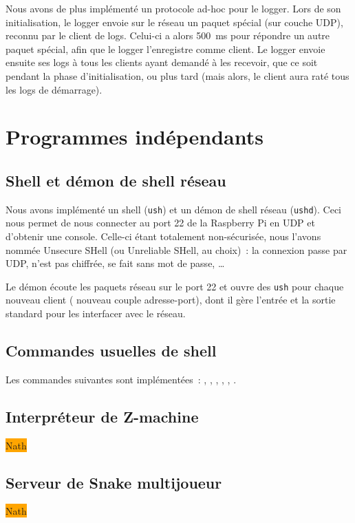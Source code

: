 \documentclass[11pt,a4paper]{article}
\newcommand{\fname}[1]{\texttt{#1}} %
\newcommand{\todo}[1]{\colorbox{orange}{\color{blue}{\Large TODO:} #1}}
\begin{document}
Nous avons de plus implémenté un protocole ad-hoc pour le logger.
Lors de son initialisation, le logger envoie sur le réseau un paquet spécial
(sur couche UDP), reconnu par le client de logs. Celui-ci a alors 500\ ms pour
répondre un autre paquet spécial, afin que le logger l'enregistre comme
client. Le logger envoie ensuite ses logs à tous les clients ayant demandé à
les recevoir, que ce soit pendant la phase d'initialisation, ou plus tard
(mais alors, le client aura raté tous les logs de démarrage).

\section{Programmes indépendants}

\subsection{Shell et démon de shell réseau}
Nous avons implémenté un shell (\fname{ush}) et un démon de shell réseau
(\fname{ushd}). Ceci nous permet de nous connecter au port 22 de la
Raspberry Pi en UDP et d'obtenir une console. Celle-ci étant totalement
non-sécurisée, nous l'avons nommée Unsecure SHell (ou Unreliable SHell,
au choix)~: la connexion passe par UDP, n'est pas chiffrée, se fait sans mot
de passe, \ldots

Le démon écoute les paquets réseau sur le port 22 et ouvre des \fname{ush}
pour chaque nouveau client (\ie{} nouveau couple adresse-port), dont il gère
l'entrée et la sortie standard pour les interfacer avec le réseau.

\subsection{Commandes usuelles de shell}
Les commandes suivantes sont implémentées~:
, , , , , .

\subsection{Interpréteur de Z-machine}
\todo{Nath}

\subsection{Serveur de Snake multijoueur}
\todo{Nath}
\end{document}
